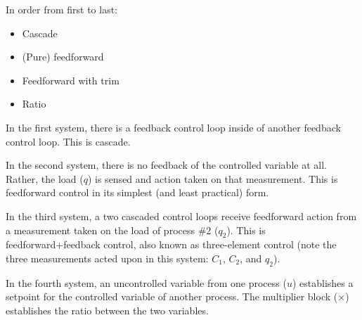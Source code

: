 





In order from first to last:

\begin{itemize}
\item{} Cascade 
\item{} (Pure) feedforward
\item{} Feedforward with trim
\item{} Ratio
\end{itemize}







In the first system, there is a feedback control loop inside of another feedback control loop.  This is cascade.
 
\vskip 10pt

In the second system, there is no feedback of the controlled variable at all.  Rather, the load ($q$) is sensed and action taken on that measurement.  This is feedforward control in its simplest (and least practical) form.
 
\vskip 10pt

In the third system, a two cascaded control loops receive feedforward action from a measurement taken on the load of process \#2 ($q_2$).  This is feedforward+feedback control, also known as three-element control (note the three measurements acted upon in this system: $C_1$, $C_2$, and $q_2$).
 
\vskip 10pt

In the fourth system, an uncontrolled variable from one process ($u$) establishes a setpoint for the controlled variable of another process.  The multiplier block ($\times$) establishes the ratio between the two variables.




